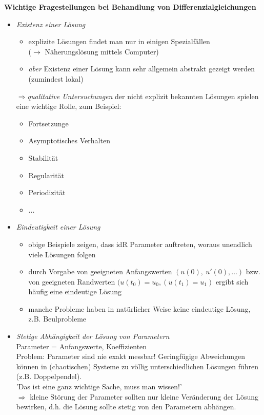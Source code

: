 \textbf{Wichtige Fragestellungen bei Behandlung von Differenzialgleichungen}\\
\begin{itemize}
    \item \emph{Existenz einer Lösung}
        \begin{itemize}
            \item explizite Lösungen findet man nur in einigen Spezialfällen\\
                ($\rightarrow $ Näherungslösung mittels Computer)
            \item 
                \emph{aber} Existenz einer Lösung kann 
                sehr allgemein abstrakt gezeigt werden (zumindest lokal)
        \end{itemize}
        $\Rightarrow $\emph{qualitative Untersuchungen} 
        der nicht explizit bekannten Lösungen spielen eine wichtige Rolle,
        zum Beispiel:
        \begin{itemize}
            \item Fortsetzunge
            \item Asymptotisches Verhalten
            \item Stabilität
            \item Regularität
            \item Periodizität
            \item ...
        \end{itemize}
    \item \emph{Eindeutigkeit einer Lösung}
        \begin{itemize}
            \item obige Beispiele zeigen, dass idR Parameter auftreten,
                 woraus unendlich viele Lösungen folgen
            \item durch Vorgabe von geeigneten Anfangswerten $(u(0), \ u'(0), \ldots)$
                bzw. von geeigneten  Randwerten $(u(t_0) = u_0, (u(t_1) = u_1) $ 
                ergibt sich häufig eine  eindeutige Lösung
            \item manche Probleme haben in natürlicher Weise keine eindeutige Lösung,
                z.B. Beulprobleme
        \end{itemize}
    \item \emph{Stetige Abhängigkeit der Lösung von Parametern} \\
        Parameter = Anfangswerte, Koeffizienten\\
        Problem: Parameter sind nie exakt messbar! Geringfügige Abweichungen können
        in (chaotischen) Systeme zu völlig unterschiedlichen Lösungen führen 
        (z.B. Doppelpendel). \\
        'Das ist eine ganz wichtige Sache, muss man wissen!'\\
        $\Rightarrow $ kleine Störung der Parameter sollten nur 
        kleine Veränderung der Lösung bewirken, d.h. die Lösung sollte stetig
        von den Parametern abhängen.
\end{itemize}

